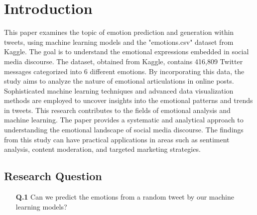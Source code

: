 \section{Introduction\label{sec:Introduction}}


This paper examines the topic of emotion prediction and generation within tweets, using machine learning models and the "emotions.csv" dataset from Kaggle. The goal is to understand the emotional expressions embedded in social media discourse.
The dataset, obtained from Kaggle, contains 416,809 Twitter messages categorized into 6 different emotions. By incorporating this data, the study aims to analyze the nature of emotional articulations in online posts. Sophisticated machine learning techniques and advanced data visualization methods are employed to uncover insights into the emotional patterns and trends in tweets. This research contributes to the fields of emotional analysis and machine learning.
The paper provides a systematic and analytical approach to understanding the emotional landscape of social media discourse. The findings from this study can have practical applications in areas such as sentiment analysis, content moderation, and targeted marketing strategies.

\subsection{Research Question\label{sec:Research Question}}

\begin{itemize}
\item[\small\textbf{Q.1}]
Can we predict the emotions from a random tweet by our machine learning models?
\end{itemize}


